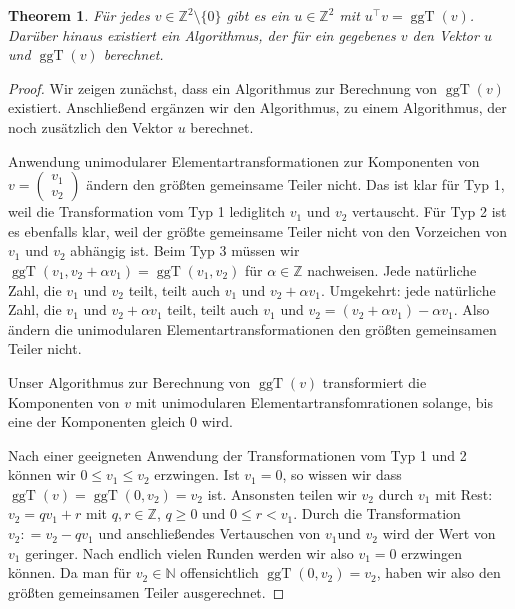 \documentclass[
a4paper,landscape,16pt,
bibliography=totocnumbered,
numbers=noenddot,
]{scrartcl}
\numberwithin{equation}{subsection}
\newcommand{\N}{\mathbb N}
\newcommand{\Z}{\mathbb Z}
\newcommand{\ggT}{\operatorname{ggT}} %
\theoremstyle{plain}
\newtheorem*{thm}{Theorem}
\theoremstyle{definition}
\begin{document}
\begin{thm} 
	Für jedes $v \in \Z^2 \setminus \{0\}$ gibt es ein $u \in \Z^2$ mit $u^\top v = \ggT(v)$. Darüber hinaus existiert ein Algorithmus, der für ein gegebenes $v$ den Vektor $u$ und $\ggT(v)$ berechnet. 
\end{thm} 
\begin{proof} 
	Wir zeigen zunächst, dass ein Algorithmus zur Berechnung von $\ggT(v)$ existiert. Anschließend ergänzen wir den Algorithmus, zu einem Algorithmus, der noch zusätzlich den Vektor $u$ berechnet. 


	Anwendung unimodularer Elementartransformationen zur Komponenten von  $v = \begin{pmatrix} v_1 \\ v_2 \end{pmatrix}$ ändern den größten gemeinsame Teiler nicht. Das ist klar für Typ 1, weil die Transformation vom Typ 1 lediglitch $v_1$ und $v_2$ vertauscht. Für Typ 2 ist es ebenfalls klar, weil der größte gemeinsame Teiler nicht von den Vorzeichen von $v_1$ und $v_2$ abhängig ist. Beim Typ 3 müssen wir $\ggT(v_1, v_2 + \alpha v_1) = \ggT(v_1,v_2)$ für $\alpha \in \Z$ nachweisen. Jede natürliche Zahl, die $v_1$ und $v_2$ teilt, teilt auch $v_1$ und $v_2 + \alpha v_1$. Umgekehrt: jede natürliche Zahl, die $v_1$ und $v_2+ \alpha v_1$ teilt, teilt auch $v_1$ und $v_2 = (v_2+ \alpha v_1) - \alpha v_1$. Also ändern die unimodularen Elementartransformationen den größten gemeinsamen Teiler nicht. 
	
	Unser Algorithmus zur Berechnung von $\ggT(v)$ transformiert die Komponenten von $v$ mit unimodularen Elementartransfomrationen solange, bis eine der Komponenten gleich $0$ wird.  

	
	Nach einer geeigneten Anwendung der Transformationen vom Typ 1 und 2 können wir $0 \le v_1 \le v_2$ erzwingen. Ist $v_1=0$, so wissen wir dass $\ggT(v) = \ggT(0,v_2) = v_2$ ist. Ansonsten teilen wir $v_2$ durch $v_1$ mit Rest: $v_2 = q v_1 + r$ mit $q,r \in \Z$, $q \ge 0$ und $0 \le r < v_1$. Durch die Transformation $v_2 : = v_2 - q v_1$ und anschließendes Vertauschen von $v_1$und $v_2$ wird der Wert von $v_1$ geringer. Nach endlich vielen Runden werden wir also $v_1=0$ erzwingen können. Da man für $v_2 \in \N$ offensichtlich $\ggT(0,v_2) = v_2$, haben wir also den größten gemeinsamen Teiler ausgerechnet. 
	

\end{proof}
\end{document}
